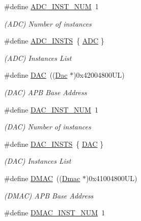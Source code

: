 \begin{DoxyCompactItemize}
\#define \mbox{\hyperlink{group___s_a_m_d21_e15_l__base_gac539e8e2e65134854344ceb66b3bab64}{A\+D\+C\+\_\+\+I\+N\+S\+T\+\_\+\+N\+UM}}~1
\begin{DoxyCompactList}\small\item\em (A\+DC) Number of instances \end{DoxyCompactList}\item 
\#define \mbox{\hyperlink{group___s_a_m_d21_e15_l__base_gac8cdf23f347cb42af81b527251ff1dd5}{A\+D\+C\+\_\+\+I\+N\+S\+TS}}~\{ \mbox{\hyperlink{group___s_a_m_d21_j18_a__base_ga54d148b91f3d356713f7e367a2243bea}{A\+DC}} \}
\begin{DoxyCompactList}\small\item\em (A\+DC) Instances List \end{DoxyCompactList}\item 
\#define \mbox{\hyperlink{group___s_a_m_d21_e15_l__base_ga4aa2a4ab86ce00c23035e5cee2e7fc7e}{D\+AC}}~((\mbox{\hyperlink{struct_dac}{Dac}}      $\ast$)0x42004800\+U\+L)
\begin{DoxyCompactList}\small\item\em (D\+AC) A\+PB Base Address \end{DoxyCompactList}\item 
\#define \mbox{\hyperlink{group___s_a_m_d21_e15_l__base_ga1aa937dc9f0c19c37cee542da2e5fcb4}{D\+A\+C\+\_\+\+I\+N\+S\+T\+\_\+\+N\+UM}}~1
\begin{DoxyCompactList}\small\item\em (D\+AC) Number of instances \end{DoxyCompactList}\item 
\#define \mbox{\hyperlink{group___s_a_m_d21_e15_l__base_ga41e76b9489ebc119fc3b8a13a7b98040}{D\+A\+C\+\_\+\+I\+N\+S\+TS}}~\{ \mbox{\hyperlink{group___s_a_m_d21_j18_a__base_ga4aa2a4ab86ce00c23035e5cee2e7fc7e}{D\+AC}} \}
\begin{DoxyCompactList}\small\item\em (D\+AC) Instances List \end{DoxyCompactList}\item 
\#define \mbox{\hyperlink{group___s_a_m_d21_e15_l__base_ga9f8bc0e77445ff4bc6fc2db5c2828667}{D\+M\+AC}}~((\mbox{\hyperlink{struct_dmac}{Dmac}}     $\ast$)0x41004800\+U\+L)
\begin{DoxyCompactList}\small\item\em (D\+M\+AC) A\+PB Base Address \end{DoxyCompactList}\item 
\#define \mbox{\hyperlink{group___s_a_m_d21_e15_l__base_ga31ad3fc52c58ae5ac7b44d6cf3d950f5}{D\+M\+A\+C\+\_\+\+I\+N\+S\+T\+\_\+\+N\+UM}}~1

\end{DoxyCompactItemize}
